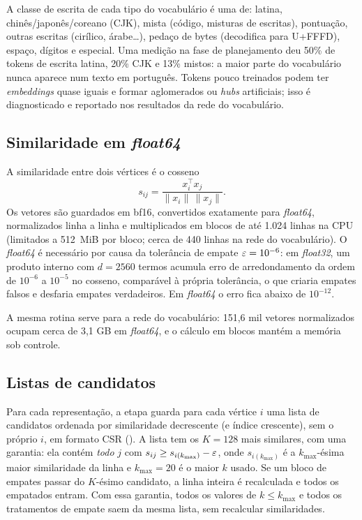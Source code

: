 A classe de escrita de cada tipo do vocabulário é uma de: latina, chinês/japonês/coreano (CJK),
mista (código, misturas de escritas), pontuação, outras escritas (cirílico, árabe\ldots), pedaço
de bytes (decodifica para U+FFFD), espaço, dígitos e especial. Uma medição na fase de
planejamento deu 50\% de tokens de escrita latina, 20\% CJK e 13\% mistos: a maior parte do
vocabulário nunca aparece num texto em português. Tokens pouco treinados podem ter
\emph{embeddings} quase iguais e formar aglomerados ou \emph{hubs} artificiais; isso é
diagnosticado e reportado nos resultados da rede do vocabulário.

\subsection{Similaridade em \emph{float64}}\label{sec:red-cosseno}

A similaridade entre dois vértices é o cosseno
\begin{equation}
    s_{ij} = \frac{x_i^\top x_j}{\lVert x_i\rVert\,\lVert x_j\rVert}.
\end{equation}
Os vetores são guardados em bf16, convertidos exatamente para \emph{float64}, normalizados
linha a linha e multiplicados em blocos de até 1.024 linhas na CPU (limitados a 512~MiB por
bloco; cerca de 440 linhas na rede do vocabulário). O \emph{float64} é necessário
por causa da tolerância de empate $\varepsilon=10^{-6}$: em \emph{float32}, um produto interno com
$d=2560$ termos acumula erro de arredondamento da ordem de $10^{-6}$ a $10^{-5}$ no cosseno,
comparável à própria tolerância, o que criaria empates falsos e desfaria empates verdadeiros.
Em \emph{float64} o erro fica abaixo de $10^{-12}$.

A mesma rotina serve para a rede do vocabulário: 151,6 mil vetores normalizados ocupam cerca de
3,1 GB em \emph{float64}, e o cálculo em blocos mantém a memória sob controle.

\subsection{Listas de candidatos}\label{sec:red-candidatos}

Para cada representação, a etapa guarda para cada vértice $i$ uma lista de candidatos ordenada
por similaridade decrescente (e índice crescente), sem o próprio $i$, em formato CSR
(). A lista tem os $K=128$ mais similares, com uma garantia: ela contém
\emph{todo} $j$ com $s_{ij}\ge s_{i(k_{\max})}-\varepsilon$, onde $s_{i(k_{\max})}$ é a
$k_{\max}$-ésima maior similaridade da linha e $k_{\max}=20$ é o maior $k$ usado. Se um bloco de
empates passar do $K$-ésimo candidato, a linha inteira é recalculada e todos os empatados
entram. Com essa garantia, todos os valores de $k\le k_{\max}$ e todos os tratamentos de empate
saem da mesma lista, sem recalcular similaridades.

